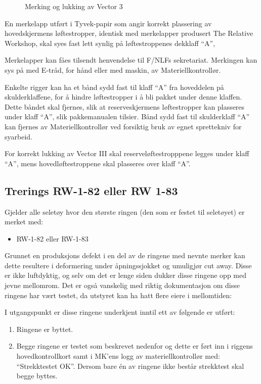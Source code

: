 \begin{figure}
	\caption{Merking og lukking av Vector 3}
\end{figure}

En merkelapp utført i Tyvek-papir som angir korrekt plassering av hovedskjermens løftestropper, identisk med merkelapper produsert The Relative Workshop, skal syes fast lett synlig på løftestroppenes dekklaff ``A'',

Merkelapper kan fåes tilsendt henvendelse til F/NLFs sekretariat. Merkingen kan sys på med E-tråd, for hånd eller med maskin, av Materiellkontrollør.

Enkelte rigger kan ha et bånd sydd fast til klaff ``A'' fra hoveddelen på skulderklaffene, for å hindre løftestropper i å bli pakket under denne klaffen. Dette båndet skal fjernes, slik at reserveskjermens løftestropper kan plasseres under klaff ``A'', slik pakkemanualen tilsier. Bånd sydd fast til skulderklaff ``A'' kan fjernes av Materiellkontrollør ved forsiktig bruk av egnet sprettekniv for syarbeid.

For korrekt lukking av Vector III skal reserveløftestropppene legges under klaff ``A'', mens hovedløftestroppene skal plasseres over klaff ``A''.

\subsection{Trerings RW-1-82 eller RW 1-83}
Gjelder alle seletøy hvor den største ringen (den som er festet til seletøyet) er merket med:
\begin{itemize}
\item RW-1-82 eller RW-1-83
\end{itemize}

Grunnet en produksjons defekt i en del av de ringene med nevnte merker kan dette resultere i deformering under åpningssjokket og umuligjør cut away. Disse er ikke luftdyktig, og selv om det er lenge siden dukker disse ringene opp med jevne mellomrom. Det er også vanskelig med riktig dokumentasjon om disse ringene har vært testet, da utstyret kan ha hatt flere eiere i mellomtiden:

I utgangspunkt er disse ringene underkjent inntil ett av følgende er utført:
\begin{enumerate}
\item Ringene er byttet.
\item Begge ringene er testet som beskrevet nedenfor og dette er ført inn i riggens hovedkontrollkort samt i MK'ens logg av materiellkontrollør med: ``Strekktestet OK''. Dersom bare én av ringene ikke består strekktest skal begge byttes.
\end{enumerate}

